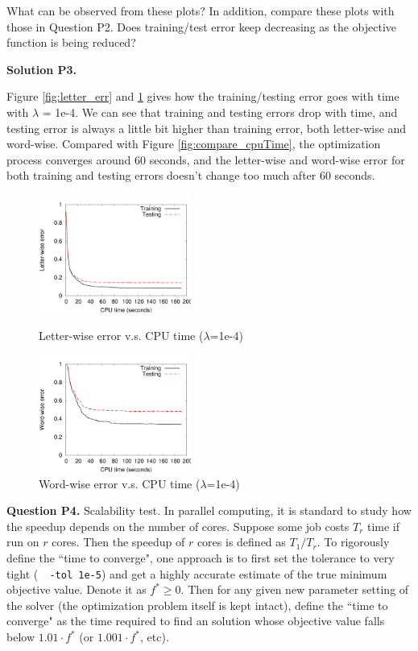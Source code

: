 \documentclass[11pt]{report}
\begin{document}
{What can be observed from these plots?
In addition, compare these plots with those in Question P2.
Does training/test error keep decreasing as the objective function is being reduced?

{\bf Solution P3.}

Figure \ref{fig:letter_err} and \ref{fig:word_err} gives how the training/testing error goes with time with $\lambda$ = {\sf 1e-4}. We can see that training and testing errors drop with time, and testing error is always a little bit higher than training error, both letter-wise and word-wise. Compared with Figure \ref{fig:compare_cpuTime}, the optimization process converges around 60 seconds, and the letter-wise and word-wise error for both training and testing errors doesn't change too much after 60 seconds.

\begin{figure}[htbp!]
\centering
\begin{minipage}[t]{0.49\textwidth}
\centering
\includegraphics[width=5cm]{p3_letter_err.pdf}
\caption{Letter-wise error v.s. CPU time ($\lambda$=1e-4)}
\label{fig:letter_err}
\end{minipage}
%
\begin{minipage}[t]{0.49\textwidth}
\centering
\includegraphics[width=5cm]{p3_word_err.pdf}
\caption{Word-wise error v.s. CPU time ($\lambda$=1e-4)}
\label{fig:word_err}
\end{minipage}
\end{figure}


{\bf Question P4.}
Scalability test.
In parallel computing, it is standard to study how the speedup depends on the number of cores.
Suppose some job costs $T_r$ time if run on $r$ cores.
Then the speedup of $r$ cores is defined as $T_1 / T_r$.
To rigorously define the ``time to converge",
one approach is to first set the tolerance to very tight (\eg\ \verb! -tol 1e-5!)
and get a highly accurate estimate of the true minimum objective value.
Denote it as $f^* \ge 0$.
Then for any given new parameter setting of the solver (the optimization problem itself is kept intact), define the ``time to converge" as the time required to find an solution whose objective value falls below $1.01 \cdot f^*$ (or  $1.001 \cdot f^*$, etc).

}
\end{document}
